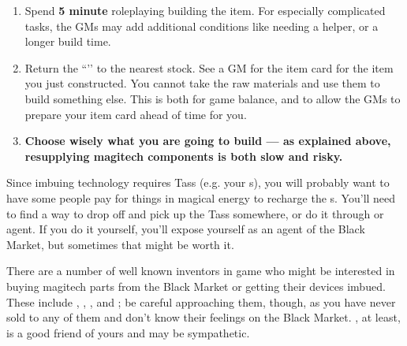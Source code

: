 \documentclass[green]{GL2020}
\begin{document}
\begin{enumerate}
\begin{enumerate}
  \item Spend \textbf{5 minute} roleplaying building the item. For especially complicated tasks, the GMs may add additional conditions like needing a helper, or a longer build time.
  \item Return the ``\iMagitechParts{}’’ to the nearest stock. See a GM for the item card for the item you just constructed. You cannot take the raw materials and use them to build something else. This is both for game balance, and to allow the GMs to prepare your item card ahead of time for you.
   \item \textbf{Choose wisely what you are going to build — as explained above, resupplying magitech components is both slow and risky.}
  \end{enumerate}
\end{enumerate}

Since imbuing technology requires Tass (e.g. your \iChargingStone{}s), you will probably want to have some people pay for things in magical energy to recharge the \iChargingStone{}s. You’ll need to find a way to drop off and pick up the Tass somewhere, or do it through \cChupSecond{} or \cChupSecond{\their} agent. If you do it yourself, you’ll expose yourself as an agent of the Black Market, but sometimes that might be worth it.

There are a number of well known inventors in game who might be interested in buying magitech parts from the Black Market or getting their devices imbued. These include \cTechStar{}, \cAssistantScientist{}, \cBunker{}, and \cHeadScientist{}; be careful approaching them, though, as you have never sold to any of them and don’t know their feelings on the Black Market. \cHeadScientist{}, at least, is a good friend of yours and may be sympathetic.
\end{document}
